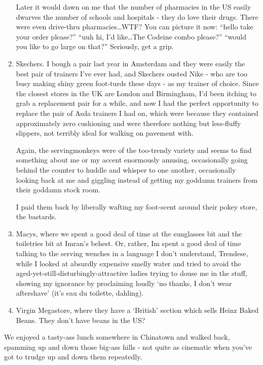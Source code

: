 \documentclass[a5paper,10pt,titlepage,draft]{book}
\begin{document}
\begin{enumerate}
Later it would dawn on me that the number of pharmacies in the US easily dwarves the number of schools and hospitals - they do love their drugs.  There were even drive-thru pharmacies\ldots WTF?  You can picture it now: ``hello take your order please?'' ``uuh hi, I'd like\ldots The Codeine combo please?'' ``would you like to go large on that?''  Seriously, get a grip.

\item Skechers.  I bough a pair last year in Amsterdam and they were easily the best pair of trainers I've ever had, and Skechers ousted Nike - who are too busy making shiny green foot-turds these days - as my trainer of choice.  Since the closest stores in the UK are London and Birmingham, I'd been itching to grab a replacement pair for a while, and now I had the perfect opportunity to replace the pair of  Asda trainers I had on, which were  because they contained approximately zero cushioning and were therefore nothing but less-fluffy slippers, not terribly ideal for walking on pavement with.

Again, the servingmonkeys were of the too-trendy variety and seems to find something about me or my accent enormously amusing, occasionally going behind the counter to huddle and whisper to one another, occasionally looking back at me and giggling instead of getting my goddamn trainers from their goddamn stock room.

I paid them back by liberally wafting my foot-scent around their pokey store, the bastards.

\item Macys, where we spent a good deal of time at the sunglasses bit and the toiletries bit at Imran's behest.  Or, rather, Im spent a good deal of time talking to the serving wenches in a language I don't understand, Trendese, while I looked at absurdly expensive smelly water and tried to avoid the aged-yet-still-disturbingly-attractive ladies trying to douse me in the stuff, showing my ignorance by proclaiming loudly `no thanks, I don't wear aftershave' (it's eau du toilette, dahling).

\item Virgin Megastore, where they have a `British' section which sells Heinz Baked Beans.  They don't have beans in the US?
\end{enumerate}

We enjoyed a tasty-ass lunch somewhere in Chinatown and walked back, spamming up and down those big-ass hills - not quite as cinematic when you've got to trudge up and down them repeatedly.
\end{document}
